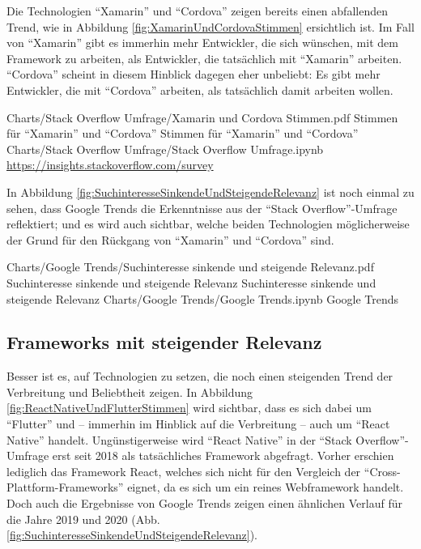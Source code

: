 Die Technologien \enquote{Xamarin} und \enquote{Cordova} zeigen bereits einen abfallenden Trend, wie in Abbildung \ref{fig:XamarinUndCordovaStimmen} ersichtlich ist.
Im Fall von \enquote{Xamarin} gibt es immerhin mehr Entwickler, die sich wünschen, mit dem Framework zu arbeiten, als Entwickler, die tatsächlich mit \enquote{Xamarin} arbeiten.
\enquote{Cordova} scheint in diesem Hinblick dagegen eher unbeliebt: Es gibt mehr Entwickler, die mit \enquote{Cordova} arbeiten, als tatsächlich damit arbeiten wollen.

\begin{alexfigurewithnotebook}{Charts/Stack Overflow Umfrage/Xamarin und Cordova Stimmen.pdf}
	{Stimmen für \enquote{Xamarin} und \enquote{Cordova}}
	{Stimmen für \enquote{Xamarin} und \enquote{Cordova}}
	{Charts/Stack Overflow Umfrage/Stack Overflow Umfrage.ipynb}
	{\url{https://insights.stackoverflow.com/survey}}
	\label{fig:XamarinUndCordovaStimmen}

\end{alexfigurewithnotebook}


In Abbildung \ref{fig:SuchinteresseSinkendeUndSteigendeRelevanz} ist noch einmal zu sehen, dass Google Trends die Erkenntnisse aus der \enquote{Stack Overflow}-Umfrage reflektiert;
und es wird auch sichtbar, welche beiden Technologien möglicherweise der Grund für den Rückgang von \enquote{Xamarin} und \enquote{Cordova} sind.

\begin{alexfigurewithnotebook}{Charts/Google Trends/Suchinteresse sinkende und steigende Relevanz.pdf}
	{Suchinteresse sinkende und steigende Relevanz}
	{Suchinteresse sinkende und steigende Relevanz}
	{Charts/Google Trends/Google Trends.ipynb}
	{Google Trends}
	\label{fig:SuchinteresseSinkendeUndSteigendeRelevanz}

\end{alexfigurewithnotebook}

\subsection{Frameworks mit steigender Relevanz}

Besser ist es, auf Technologien zu setzen, die noch einen steigenden Trend der Verbreitung und Beliebtheit zeigen.
In Abbildung \ref{fig:ReactNativeUndFlutterStimmen} wird sichtbar, dass es sich dabei um \enquote{Flutter} und -- immerhin im Hinblick auf die Verbreitung -- auch um \enquote{React Native} handelt.
Ungünstigerweise wird \enquote{React Native} in der \enquote{Stack Overflow}-Umfrage erst seit 2018 als tatsächliches Framework abgefragt.
Vorher erschien lediglich das Framework React, welches sich nicht für den Vergleich der \enquote{Cross-Plattform-Frameworks} eignet, da es sich um ein reines Webframework handelt.
Doch auch die Ergebnisse von Google Trends zeigen einen ähnlichen Verlauf für die Jahre 2019 und 2020 (Abb. \ref{fig:SuchinteresseSinkendeUndSteigendeRelevanz}).

